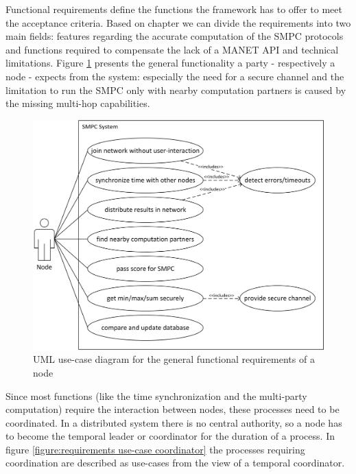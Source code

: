 	Functional requirements define the functions the framework has to offer to meet the acceptance criteria. Based on chapter  we can divide the requirements into two main fields: features regarding the accurate computation of the \gls{SMPC} protocols and functions required to compensate the lack of a \gls{MANET} \gls{API} and technical limitations.
	Figure \ref{figure:requirements use-case node} presents the general functionality a party - respectively a node - expects from the system: especially the need for a secure channel and the limitation to run the \gls{SMPC} only with nearby computation partners is caused by the missing multi-hop capabilities.
	
	\begin{figure}[!htb] %
	\caption{\gls{UML} use-case diagram for the general functional requirements of a node} \label{figure:requirements use-case node}
	\includegraphics[scale=0.85]{figures/use-case-node.png}
	\end{figure}

	Since most functions (like the time synchronization and the multi-party computation) require the interaction between nodes, these processes need to be coordinated. In a distributed system there is no central authority, so a node has to become the temporal leader or coordinator for the duration of a process. In figure \ref{figure:requirements use-case coordinator} the processes requiring coordination are described as use-cases from the view of a temporal coordinator.
	

